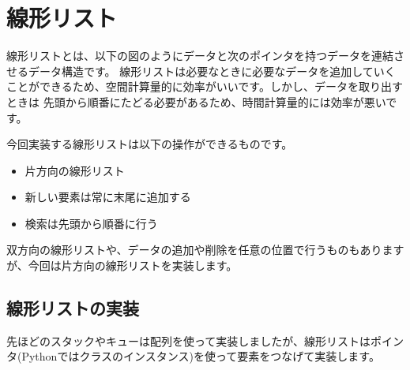 \documentclass{jlreq}
\begin{document}
\newpage

\section{線形リスト}

線形リストとは、以下の図のようにデータと次のポインタを持つデータを連結させるデータ構造です。
線形リストは必要なときに必要なデータを追加していくことができるため、空間計算量的に効率がいいです。しかし、データを取り出すときは
先頭から順番にたどる必要があるため、時間計算量的には効率が悪いです。

今回実装する線形リストは以下の操作ができるものです。

\begin{itemize}
	\item 片方向の線形リスト
	\item 新しい要素は常に末尾に追加する
	\item 検索は先頭から順番に行う
\end{itemize}

双方向の線形リストや、データの追加や削除を任意の位置で行うものもありますが、今回は片方向の線形リストを実装します。

\vspace{1cm}


\vspace{1cm}

\subsection{線形リストの実装}
先ほどのスタックやキューは配列を使って実装しましたが、線形リストはポインタ(Pythonではクラスのインスタンス)を使って要素をつなげて実装します。
\end{document}
